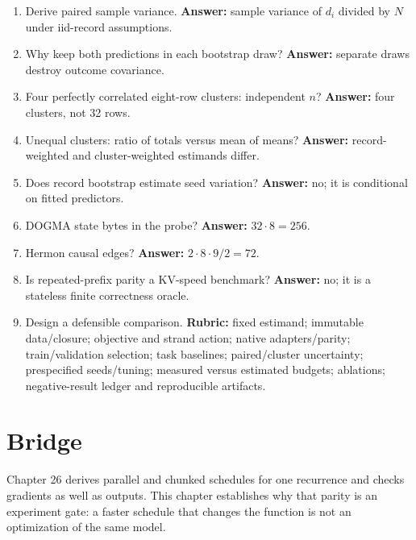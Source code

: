 \begin{enumerate}
\item Derive paired sample variance. \textbf{Answer:}
sample variance of $d_i$ divided by $N$ under iid-record assumptions.
\item Why keep both predictions in each bootstrap draw?
\textbf{Answer:} separate draws destroy outcome covariance.
\item Four perfectly correlated eight-row clusters: independent $n$?
\textbf{Answer:} four clusters, not 32 rows.
\item Unequal clusters: ratio of totals versus mean of means?
\textbf{Answer:} record-weighted and cluster-weighted estimands differ.
\item Does record bootstrap estimate seed variation? \textbf{Answer:}
no; it is conditional on fitted predictors.
\item DOGMA state bytes in the probe? \textbf{Answer:} $32\cdot8=256$.
\item Hermon causal edges? \textbf{Answer:} $2\cdot8\cdot9/2=72$.
\item Is repeated-prefix parity a KV-speed benchmark? \textbf{Answer:}
no; it is a stateless finite correctness oracle.
\item Design a defensible comparison. \textbf{Rubric:} fixed estimand;
immutable data/closure; objective and strand action; native adapters/parity;
train/validation selection; task baselines; paired/cluster uncertainty;
prespecified seeds/tuning; measured versus estimated budgets; ablations;
negative-result ledger and reproducible artifacts.
\end{enumerate}

\section{Bridge}
Chapter 26 derives parallel and chunked schedules for one recurrence and
checks gradients as well as outputs. This chapter establishes why that
parity is an experiment gate: a faster schedule that changes the function
is not an optimization of the same model.
